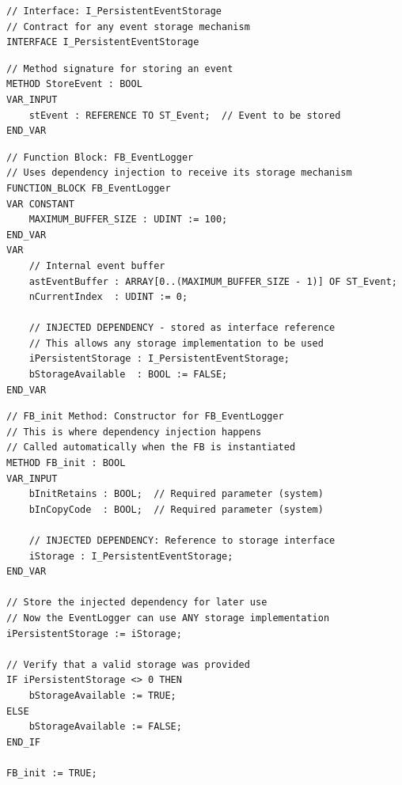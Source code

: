 \documentclass[11pt,a4paper]{article}
\begin{document}
\begin{lstlisting}
// Interface: I_PersistentEventStorage
// Contract for any event storage mechanism
INTERFACE I_PersistentEventStorage
\end{lstlisting}

\begin{lstlisting}
// Method signature for storing an event
METHOD StoreEvent : BOOL
VAR_INPUT
    stEvent : REFERENCE TO ST_Event;  // Event to be stored
END_VAR
\end{lstlisting}

\begin{lstlisting}
// Function Block: FB_EventLogger
// Uses dependency injection to receive its storage mechanism
FUNCTION_BLOCK FB_EventLogger
VAR CONSTANT
    MAXIMUM_BUFFER_SIZE : UDINT := 100;
END_VAR
VAR
    // Internal event buffer
    astEventBuffer : ARRAY[0..(MAXIMUM_BUFFER_SIZE - 1)] OF ST_Event;
    nCurrentIndex  : UDINT := 0;
    
    // INJECTED DEPENDENCY - stored as interface reference
    // This allows any storage implementation to be used
    iPersistentStorage : I_PersistentEventStorage;
    bStorageAvailable  : BOOL := FALSE;
END_VAR
\end{lstlisting}

\begin{lstlisting}
// FB_init Method: Constructor for FB_EventLogger
// This is where dependency injection happens
// Called automatically when the FB is instantiated
METHOD FB_init : BOOL
VAR_INPUT
    bInitRetains : BOOL;  // Required parameter (system)
    bInCopyCode  : BOOL;  // Required parameter (system)
    
    // INJECTED DEPENDENCY: Reference to storage interface
    iStorage : I_PersistentEventStorage;
END_VAR

// Store the injected dependency for later use
// Now the EventLogger can use ANY storage implementation
iPersistentStorage := iStorage;

// Verify that a valid storage was provided
IF iPersistentStorage <> 0 THEN
    bStorageAvailable := TRUE;
ELSE
    bStorageAvailable := FALSE;
END_IF

FB_init := TRUE;
\end{lstlisting}
\end{document}
